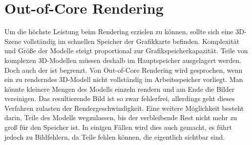 \section{Out-of-Core Rendering}
\label{sec:relwork:oocrender}
Um die höchste Leistung beim Rendering erzielen zu können, sollte sich eine 3D-Szene vollständig im schnellen Speicher der Grafikkarte befinden. Komplexität und Größe der Modelle steigt proportional zur Grafikspeicherkapazität. Teile von komplexen 3D-Modellen müssen deshalb im Hauptspeicher ausgelagert werden. Doch auch der ist begrenzt. Von Out-of-Core Rendering wird gesprochen, wenn ein zu renderndes 3D-Modell nicht vollständig im Arbeitsspeicher vorliegt. Man könnte kleinere Mengen des Modells einzeln rendern und am Ende die Bilder vereinigen. Das resultierende Bild ist so zwar fehlerfrei, allerdings geht dieses Verfahren zulasten der Rendergeschwindigkeit. Eine weitere Möglichkeit besteht darin, Teile des Modells wegzulassen, bis der verbleibende Rest nicht mehr zu groß für den Speicher ist. In einigen Fällen wird dies auch gemacht, es führt jedoch zu Bildfehlern, da Teile fehlen können, die eigentlich sichtbar sind.

